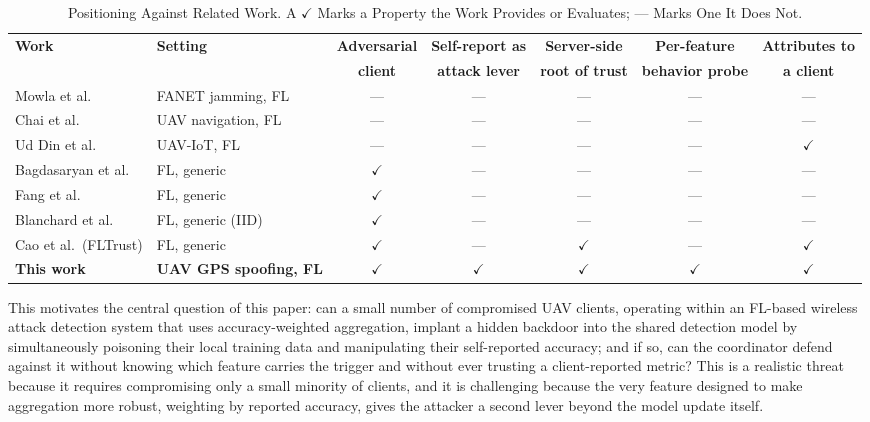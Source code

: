 \documentclass[journal]{IEEEtran}
\newcommand{\yes}{\ensuremath{\checkmark}}
\newcommand{\no}{---}
\begin{document}
\begin{table}[!t]
\renewcommand{\arraystretch}{1.25}
\caption{Positioning Against Related Work. A \yes{} Marks a Property the Work Provides or Evaluates; \no{} Marks One It Does Not.}
\label{tab:positioning}
\centering
\footnotesize
\setlength{\tabcolsep}{5pt}
\begin{tabular}{@{}l l ccccc@{}}
\toprule
\textbf{Work} & \textbf{Setting} &
\textbf{Adversarial} & \textbf{Self-report as} & \textbf{Server-side} &
\textbf{Per-feature} & \textbf{Attributes to} \\
 & & \textbf{client} & \textbf{attack lever} & \textbf{root of trust} &
\textbf{behavior probe} & \textbf{a client} \\
\midrule
Mowla et al.\ \cite{mowla2020federated}            & FANET jamming, FL  & \no  & \no  & \no  & \no  & \no  \\
Chai et al.\ \cite{chai2025navigation}             & UAV navigation, FL & \no  & \no  & \no  & \no  & \no  \\
Ud Din et al.\ \cite{udin2025federated}            & UAV-IoT, FL        & \no  & \no  & \no  & \no  & \yes \\
Bagdasaryan et al.\ \cite{bagdasaryan2020backdoor} & FL, generic        & \yes & \no  & \no  & \no  & \no  \\
Fang et al.\ \cite{fang2020local}                  & FL, generic        & \yes & \no  & \no  & \no  & \no  \\
Blanchard et al.\ \cite{blanchard2017machine}      & FL, generic (IID)  & \yes & \no  & \no  & \no  & \no  \\
Cao et al.\ (FLTrust) \cite{cao2021fltrust}        & FL, generic        & \yes & \no  & \yes & \no  & \yes \\
\midrule
\textbf{This work} & \textbf{UAV GPS spoofing, FL} & \yes & \yes & \yes & \yes & \yes \\
\bottomrule
\end{tabular}
\end{table}

This motivates the central question of this paper: can a small number of compromised UAV clients, operating within an FL-based wireless attack detection system that uses accuracy-weighted aggregation, implant a hidden backdoor into the shared detection model by simultaneously poisoning their local training data and manipulating their self-reported accuracy; and if so, can the coordinator defend against it without knowing which feature carries the trigger and without ever trusting a client-reported metric? This is a realistic threat because it requires compromising only a small minority of clients, and it is challenging because the very feature designed to make aggregation more robust, weighting by reported accuracy, gives the attacker a second lever beyond the model update itself.
\end{document}
